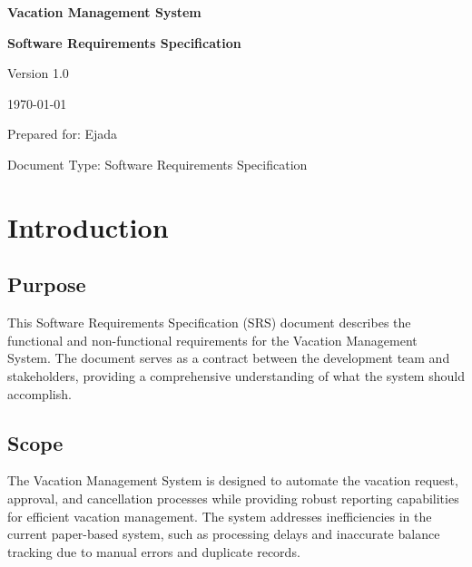 \documentclass[12pt,a4paper]{article}
\begin{document}
\begin{titlepage}
\centering
\vspace*{2cm}
{\Huge\bfseries Vacation Management System\par}
\vspace{1cm}
{\Large\bfseries Software Requirements Specification\par}
\vspace{2cm}
{\large Version 1.0\par}
\vspace{1cm}
{\large \today\par}
\vspace{2cm}
{\large Prepared for: Ejada\par}
\vspace{1cm}
{\large Document Type: Software Requirements Specification\par}
\vfill
\end{titlepage}

\tableofcontents
\newpage

\listoffigures
\newpage

\listoftables
\newpage

\section{Introduction}

\subsection{Purpose}
This Software Requirements Specification (SRS) document describes the functional and non-functional requirements for the Vacation Management System. The document serves as a contract between the development team and stakeholders, providing a comprehensive understanding of what the system should accomplish.

\subsection{Scope}
The Vacation Management System is designed to automate the vacation request, approval, and cancellation processes while providing robust reporting capabilities for efficient vacation management. The system addresses inefficiencies in the current paper-based system, such as processing delays and inaccurate balance tracking due to manual errors and duplicate records.
\end{document}
